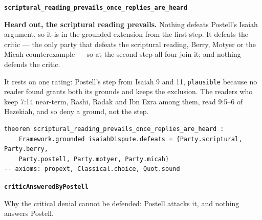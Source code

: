 \documentclass[11pt]{article}
\begin{document}
\par\medskip\noindent\textbf{\texttt{scriptural\_\allowbreak{}reading\_\allowbreak{}prevails\_\allowbreak{}once\_\allowbreak{}replies\_\allowbreak{}are\_\allowbreak{}heard}}\par\nobreak\noindent
\textbf{Heard out, the scriptural reading prevails.} Nothing defeats Postell’s Isaiah argument, so it is in the grounded extension from the first step. It defeats the critic — the only party that defeats the scriptural reading, Berry, Motyer or the Micah counterexample — so at the second step all four join it; and nothing defends the critic.

It rests on one rating: Postell’s step from Isaiah 9 and 11, \texttt{plausible} because no reader found grants both its grounds and keeps the exclusion. The readers who keep 7:14 near-term, Rashi, Radak and Ibn Ezra among them, read 9:5–6 of Hezekiah, and so deny a ground, not the step.

{\small\begin{verbatim}
theorem scriptural_reading_prevails_once_replies_are_heard :
    Framework.grounded isaiahDispute.defeats = {Party.scriptural, Party.berry,
    Party.postell, Party.motyer, Party.micah}
-- axioms: propext, Classical.choice, Quot.sound
\end{verbatim}}
\par\medskip\noindent\textbf{\texttt{critic\allowbreak{}Answered\allowbreak{}By\allowbreak{}Postell}}\par\nobreak\noindent
Why the critical denial cannot be defended: Postell attacks it, and nothing answers Postell.
\end{document}
